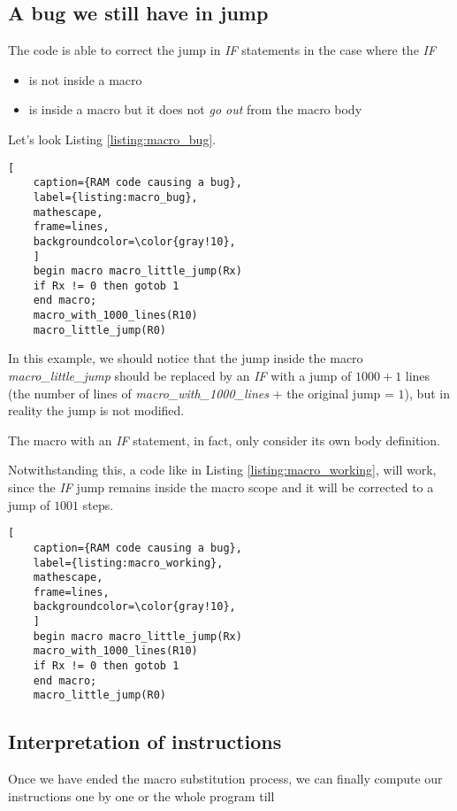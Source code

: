 \subsection{A bug we still have in jump}

The code is able to correct the jump in \textit{IF} statements in the case where the \textit{IF}
\begin{itemize}
    \item is not inside a macro
    \item is inside a macro but it does not \textit{go out} from the macro body
\end{itemize}
\newpage
Let's look Listing \ref{listing:macro_bug}.

\begin{lstlisting}[
    caption={RAM code causing a bug}, 
    label={listing:macro_bug},
    mathescape, 
    frame=lines,
    backgroundcolor=\color{gray!10},
    ]
    begin macro macro_little_jump(Rx)
    if Rx != 0 then gotob 1
    end macro;
    macro_with_1000_lines(R10)
    macro_little_jump(R0)
\end{lstlisting}

In this example, we should notice that the jump inside the macro \textit{macro\_little\_jump} should be replaced by an \textit{IF} with a jump of $1000 + 1$ lines (the number of lines of \textit{macro\_with\_1000\_lines} + the original jump = $1$), but in reality the jump is not modified.

The macro with an \textit{IF} statement, in fact, only consider its own body definition.

Notwithstanding this, a code like in Listing \ref{listing:macro_working}, will work, since the \textit{IF} jump remains inside the macro scope and it will be corrected to a jump of $1001$ steps.

\begin{lstlisting}[
    caption={RAM code causing a bug}, 
    label={listing:macro_working},
    mathescape, 
    frame=lines,
    backgroundcolor=\color{gray!10},
    ]
    begin macro macro_little_jump(Rx)
    macro_with_1000_lines(R10)
    if Rx != 0 then gotob 1
    end macro;
    macro_little_jump(R0)
\end{lstlisting}

\subsection{Interpretation of instructions}
Once we have ended the macro substitution process, we can finally compute our instructions one by one or the whole program till

